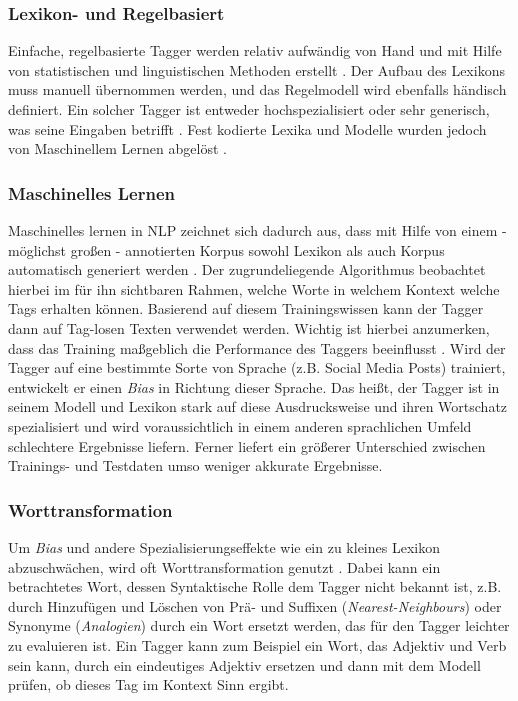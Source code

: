 \subsubsection{Lexikon- und Regelbasiert}

Einfache, regelbasierte Tagger werden relativ aufwändig von Hand und mit Hilfe von statistischen und linguistischen Methoden erstellt \cite{halteren}. Der Aufbau des Lexikons muss manuell übernommen werden, und das Regelmodell wird ebenfalls händisch definiert. Ein solcher Tagger ist entweder hochspezialisiert oder sehr generisch, was seine Eingaben betrifft \cite{Eynde}. Fest kodierte Lexika und Modelle wurden jedoch von Maschinellem Lernen abgelöst \cite{Smith} .

\subsubsection{Maschinelles Lernen}

Maschinelles lernen in NLP zeichnet sich dadurch aus, dass mit Hilfe von einem - möglichst großen - annotierten Korpus sowohl Lexikon als auch Korpus automatisch generiert werden \cite{halteren}. Der zugrundeliegende Algorithmus beobachtet hierbei im für ihn sichtbaren Rahmen, welche Worte in welchem Kontext welche Tags erhalten können. Basierend auf diesem Trainingswissen kann der Tagger dann auf Tag-losen Texten verwendet werden. Wichtig ist hierbei anzumerken, dass das Training maßgeblich die Performance des Taggers beeinflusst \cite{Smith} \cite{Sorgaard}. Wird der Tagger auf eine bestimmte Sorte von Sprache (z.B. Social Media Posts) trainiert, entwickelt er einen \textit{Bias} in Richtung dieser Sprache. Das heißt, der Tagger ist in seinem Modell und Lexikon stark auf diese Ausdrucksweise und ihren Wortschatz spezialisiert und wird voraussichtlich in einem anderen sprachlichen Umfeld schlechtere Ergebnisse liefern. Ferner liefert ein größerer Unterschied zwischen Trainings- und Testdaten umso weniger akkurate Ergebnisse.

\subsubsection{Worttransformation}

Um \textit{Bias} und andere Spezialisierungseffekte wie ein zu kleines Lexikon abzuschwächen, wird oft Worttransformation genutzt \cite{Sorgaard} \cite{Jones}. Dabei kann ein betrachtetes Wort, dessen Syntaktische Rolle dem Tagger nicht bekannt ist, z.B. durch Hinzufügen und Löschen von Prä- und Suffixen (\textit{Nearest-Neighbours}) oder Synonyme (\textit{Analogien}) durch ein Wort ersetzt werden, das für den Tagger leichter zu evaluieren ist. Ein Tagger kann zum Beispiel ein Wort, das Adjektiv und Verb sein kann, durch ein eindeutiges Adjektiv ersetzen und dann mit dem Modell prüfen, ob dieses Tag im Kontext Sinn ergibt.

